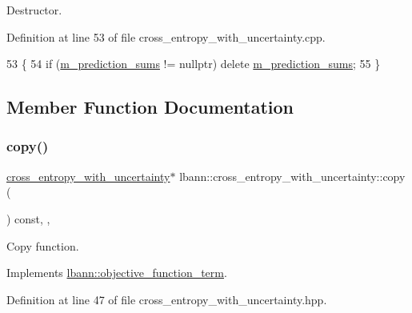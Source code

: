 Destructor. 

Definition at line 53 of file cross\+\_\+entropy\+\_\+with\+\_\+uncertainty.\+cpp.


\begin{DoxyCode}
53                                                                 \{
54   \textcolor{keywordflow}{if} (\hyperlink{classlbann_1_1cross__entropy__with__uncertainty_a4b45767c526e7ebe4a55ff1a1ddbd7ba}{m\_prediction\_sums} != \textcolor{keyword}{nullptr}) \textcolor{keyword}{delete} \hyperlink{classlbann_1_1cross__entropy__with__uncertainty_a4b45767c526e7ebe4a55ff1a1ddbd7ba}{m\_prediction\_sums};
55 \}
\end{DoxyCode}


\subsection{Member Function Documentation}
\mbox{\label{classlbann_1_1cross__entropy__with__uncertainty_a3df6ab2f0b06922f860096636242b1bd}} 
\subsubsection{\texorpdfstring{copy()}{copy()}}
{\footnotesize\ttfamily \hyperlink{classlbann_1_1cross__entropy__with__uncertainty}{cross\+\_\+entropy\+\_\+with\+\_\+uncertainty}$\ast$ lbann\+::cross\+\_\+entropy\+\_\+with\+\_\+uncertainty\+::copy (\begin{DoxyParamCaption}{ }\end{DoxyParamCaption}) const\hspace{0.3cm}{\ttfamily [inline]}, {\ttfamily [override]}, {\ttfamily [virtual]}}

Copy function. 

Implements \hyperlink{classlbann_1_1objective__function__term_ae98a4ec173a602ad55d1df20dadd4cb9}{lbann\+::objective\+\_\+function\+\_\+term}.



Definition at line 47 of file cross\+\_\+entropy\+\_\+with\+\_\+uncertainty.\+hpp.


